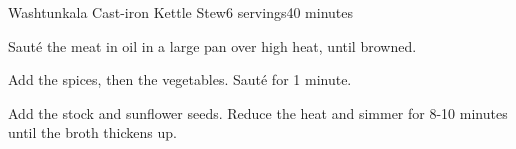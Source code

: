 \documentclass[../Cookbook.tex]{subfiles}
\begin{document}
\begin{recipe}{Washtunkala Cast-iron Kettle Stew}{6 servings}{40 minutes}

Saut\'e the meat in oil in a large pan over high heat, until browned.

Add the spices, then the vegetables. Saut\'e for 1 minute.

Add the stock and sunflower seeds. Reduce the heat and simmer for 8-10 minutes until the broth thickens up.


\end{recipe}
\end{document}
